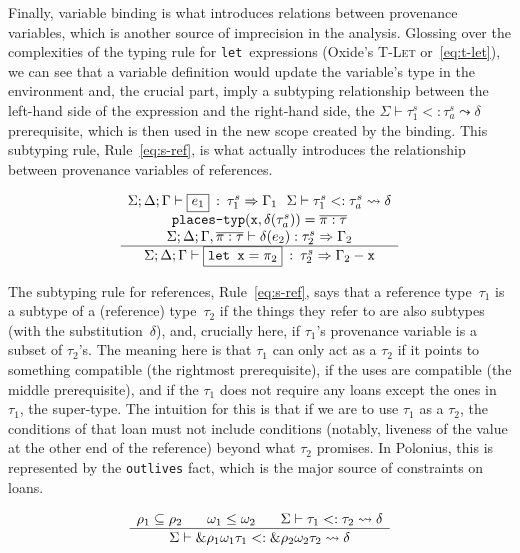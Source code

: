 \documentclass[11pt,a4paper,twoside,openany]{report}
\newcommand{\InRust}[1]{\texttt{#1}}
\newcommand{\InDatalog}[1]{\texttt{#1}}
\newcommand{\expression}[1]{\boxed{#1}}
\newcommand{\ntyperule}[2]{\begin{array}{c}#1\\\hline\raisebox{1pt}{\strut}#2\end{array}}
\begin{document}
Finally, variable binding is what introduces relations between provenance
variables, which is another source of imprecision in the analysis. Glossing over
the complexities of the typing rule for \InRust{let}~expressions (Oxide's
\textsc{T-Let} or~\eqref{eq:t-let}), we can see that a variable definition would
update the variable's type in the environment and, the crucial part, imply a
subtyping relationship between the left-hand side of the expression and the
right-hand side, the $\Sigma \vdash \tau_1 ^s <: \tau_a^s \leadsto \delta$
prerequisite, which is then used in the new scope created by the binding. This
subtyping rule, Rule~\eqref{eq:s-ref}, is what actually introduces the
relationship between provenance variables of references.

\begin{equation}\label{eq:t-let}
  \ntyperule{
    \Sigma ; \Delta ; \Gamma \vdash \expression{e_1} \: : \: \tau_1^s \Rightarrow \Gamma_1
    \:\:\: \Sigma \vdash \tau_1 ^s <: \tau_a^s \leadsto \delta \\
    \texttt{places-typ}(\mathtt{x}, \delta(\tau^s_a)) = \overline{\pi : \tau} \\
    \Sigma ; \Delta ; \Gamma, \overline{\pi : \tau} \vdash \delta(e_2) : \tau_2^s \Rightarrow \Gamma_2
  }
  {\Sigma ; \Delta ; \Gamma \vdash \expression{\texttt{let } \mathtt{x} = \pi_2} \: : \: \tau_2^s \Rightarrow \Gamma_2 - \mathtt{x}}
\end{equation}

The subtyping rule for references, Rule~\eqref{eq:s-ref}, says that a reference
type~$\tau_1$ is a subtype of a (reference) type~$\tau_2$ if the things they
refer to are also subtypes (with the substitution~$\delta$), and, crucially
here, if $\tau_1$'s provenance variable is a subset of $\tau_2$'s. The meaning
here is that $\tau_1$ can only act as a $\tau_2$ if it points to something
compatible (the rightmost prerequisite), if the uses are compatible (the middle
prerequisite), and if the $\tau_1$ does not require any loans except the ones in
$\tau_1$, the super-type. The intuition for this is that if we are to use
$\tau_1$ as a $\tau_2$, the conditions of that loan must not include conditions
(notably, liveness of the value at the other end of the reference) beyond what
$\tau_2$ promises. In Polonius, this is represented by the \InDatalog{outlives}
fact, which is the major source of constraints on loans.

\begin{equation}\label{eq:s-ref}
  \ntyperule{
    \rho_1 \subseteq \rho_2 \:\:\:\:\:\:\:\:
    \omega_1 \leq \omega_2 \:\:\:\:\:\:\:\:
    \Sigma \vdash \tau_1 <: \tau_2 \leadsto \delta
  }
  {
    \Sigma \vdash \&\rho_1 \omega_1 \tau_1 <: \& \rho_2 \omega_2 \tau_2 \leadsto \delta
  }
\end{equation}
\end{document}
